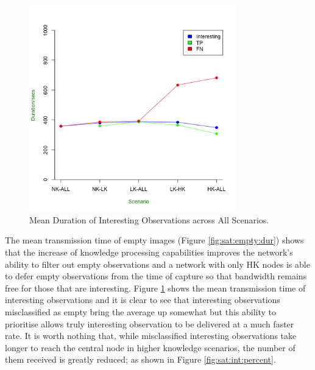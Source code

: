 	\begin{figure}[h]
	\centering
	\includegraphics[width=0.8\textwidth]{Chap7/figures/saturated/int_dur}
	\caption{Mean Duration of Interesting Observations across All Scenarios.}
	\label{fig:sat:int:dur}
	\end{figure}

The mean transmission time of empty images (Figure \ref{fig:sat:empty:dur}) shows that the increase of knowledge processing capabilities improves the network's ability to filter out empty observations and a network with only HK nodes is able to defer empty observations from the time of capture so that bandwidth remains free for those that are interesting. Figure \ref{fig:sat:int:dur} shows the mean transmission time of interesting observations and it is clear to see that interesting observations misclassified as empty bring the average up somewhat but this ability to prioritise allows truly interesting observation to be delivered at a much faster rate. It is worth nothing that, while misclassified interesting observations take longer to reach the central node in higher knowledge scenarios, the number of them received is greatly reduced; as shown in Figure \ref{fig:sat:int:percent}.

